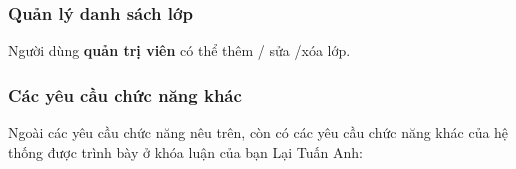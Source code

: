 \documentclass[./../main.tex]{subfiles}
\begin{document}
\hypertarget{quux1ea3n-luxfd-danh-suxe1ch-lux1edbp}{%
	\subsubsection{Quản lý danh sách
		lớp}\label{quux1ea3n-luxfd-danh-suxe1ch-lux1edbp}}

Người dùng \textbf{quản trị viên} có thể thêm / sửa /xóa lớp.

\hypertarget{cac-yeu-cau-chuc-nang-khac}{%
	\subsubsection{Các yêu cầu chức năng khác}\label{cac-yeu-cau-chuc-nang-khac}}

Ngoài các yêu cầu chức năng nêu trên, còn có các yêu cầu chức năng khác của hệ thống được trình bày ở khóa luận của bạn Lại Tuấn Anh:
\end{document}
